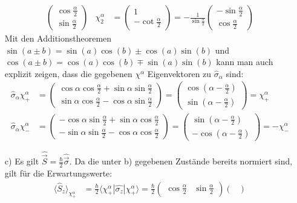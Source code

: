 \documentclass[a4paper,12pt]{article}
\newcommand{\bra}{}
\newcommand{\braket}{}
\begin{document}
\begin{enumerate}
\begin{align*}
\begin{pmatrix}
\cos\frac{\alpha}{2} \\ \sin\frac{\alpha}{2}
\end{pmatrix} &\chi_2^\alpha&=\begin{pmatrix}
1 \\ -\cot\frac{\alpha}{2}
\end{pmatrix}=-\frac{1}{\sin\frac{\alpha}{2}}\begin{pmatrix}
-\sin\frac{\alpha}{2} \\ \cos\frac{\alpha}{2}
\end{pmatrix}
\end{align*}
Mit den Additionstheoremen $\sin(a\pm b)=\sin(a)\cos(b)\pm\cos(a)\sin(b)$ und $\cos(a\pm b)=\cos(a)\cos(b)\mp\sin(a)\sin(b)$ kann man auch explizit zeigen, dass die gegebenen $\chi^\alpha$ Eigenvektoren zu $\hat{\sigma}_\alpha$ sind:
\begin{align*}
\hat{\sigma}_\alpha\chi_+^\alpha&=\begin{pmatrix}
\cos\alpha\cos\frac{\alpha}{2}+\sin\alpha\sin\frac{\alpha}{2} \\ \sin\alpha\cos\frac{\alpha}{2}-\cos\alpha\sin\frac{\alpha}{2}
\end{pmatrix}=\begin{pmatrix}
\cos(\alpha-\frac{\alpha}{2}) \\ \sin(\alpha-\frac{\alpha}{2})
\end{pmatrix}=\chi_+^\alpha \\
\hat{\sigma}_\alpha\chi_-^\alpha&=\begin{pmatrix}
-\cos\alpha\sin\frac{\alpha}{2}+\sin\alpha\cos\frac{\alpha}{2} \\ -\sin\alpha\sin\frac{\alpha}{2}-\cos\alpha\cos\frac{\alpha}{2}
\end{pmatrix}=\begin{pmatrix}
\sin(\alpha-\frac{\alpha}{2}) \\ -\cos(\alpha-\frac{\alpha}{2})
\end{pmatrix}=-\chi_-^\alpha
\end{align*}
\item[c)] Es gilt $\hat{\vec{S}}=\frac{\hbar}{2}\hat{\vec{\sigma}}$. Da die unter b) gegebenen Zustände bereits normiert sind, gilt für die Erwartungswerte:
\begin{align*}
\bra\langle {\hat{S}_z}\rangle_{\chi_+^\alpha}&=\frac{\hbar}{2}\braket\langle {\chi_+^\alpha} | {\hat{\sigma_z}} | {\chi_+^\alpha}\rangle=\frac{\hbar}{2}\begin{pmatrix}
\cos\frac{\alpha}{2} & \sin\frac{\alpha}{2}
\end{pmatrix}\begin{pmatrix}

\end{pmatrix}
\end{align*}
\end{enumerate}
\end{document}
